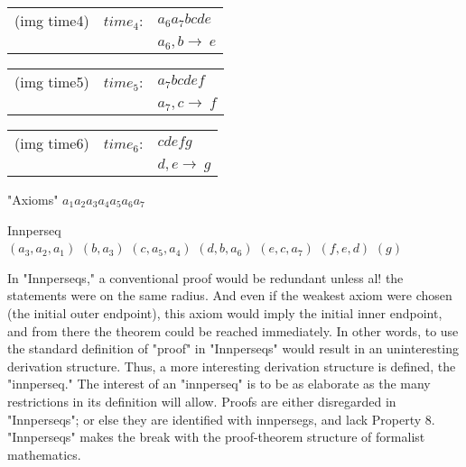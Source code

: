 \documentclass[10pt,twoside,draft]{memoir}
\newcommand{\bimg}[1]{(img #1)}
\begin{document}
{	\begin{tabular}{c r l}
		\bimg{time4} & $time_4$: & $a_6 a_7 b c d e$ \\
		& & $a_6,b \rightarrow\ e$ \\
	\end{tabular}

	\begin{tabular}{c r l}
		\bimg{time5} & $time_5$: & $a_7 b c d e f$ \\
		& & $a_7,c \rightarrow\ f$ \\
	\end{tabular}

	\begin{tabular}{c r l}
		\bimg{time6} & $time_6$: & $c d e f g$ \\
		& & $d,e \rightarrow\ g$ \\
	\end{tabular}

"Axioms" $a_1 a_2 a_3 a_4 a_5 a_6 a_7$


Innperseq \\
$(a_3,a_2,a_1)$
$(b,a_3)$
$(c,a_5,a_4)$
$(d,b,a_6)$
$(e,c,a_7)$
$(f,e,d)$
$(g)$


In "Innperseqs," a conventional proof would be redundant unless al! 
the statements were on the same radius. And even if the weakest axiom were 
chosen (the initial outer endpoint), this axiom would imply the initial inner 
endpoint, and from there the theorem could be reached immediately. In 
other words, to use the standard definition of "proof" in "Innperseqs" 
would result in an uninteresting derivation structure. Thus, a more 
interesting derivation structure is defined, the "innperseq." The interest of 
an "innperseq" is to be as elaborate as the many restrictions in its definition 
will allow. Proofs are either disregarded in "Innperseqs"; or else they are 
identified with innpersegs, and lack Property 8. "Innperseqs" makes the 
break with the proof-theorem structure of formalist mathematics. 

}
\end{document}
